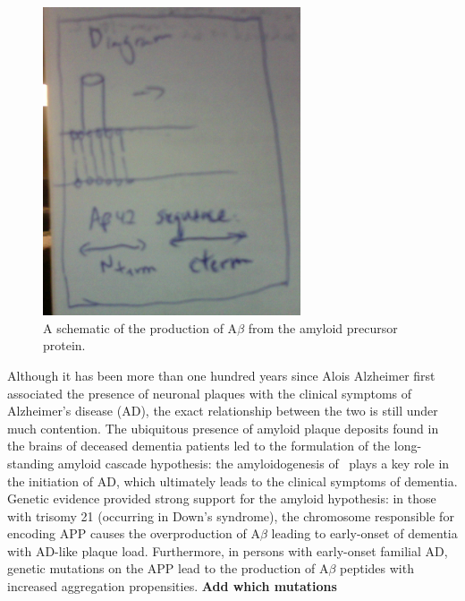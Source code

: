 \begin{figure}
\centering
\includegraphics[width=3in]{figures/introduction/AD_abeta_app.png}
\caption[APP processing]{A schematic of the production of A$\beta$ from the amyloid precursor protein.}
\label{fig:AD_abeta_app}
\end{figure}

Although it has been more than one hundred years since Alois Alzheimer first associated the presence of neuronal plaques with the clinical symptoms of Alzheimer's disease (AD), the exact relationship between the two is still under much contention.  The ubiquitous presence of amyloid plaque deposits found in the brains of deceased dementia patients led to the formulation of the long-standing amyloid cascade hypothesis: the amyloidogenesis of \abeta\ plays a key role in the initiation of AD, which ultimately leads to the clinical symptoms of dementia.\cite{Hardy:2002dh} Genetic evidence provided strong support for the amyloid hypothesis: in those with trisomy 21 (occurring in Down's syndrome), the chromosome responsible for encoding APP causes the overproduction of A$\beta$ leading to early-onset of dementia with AD-like plaque load. Furthermore, in persons with early-onset familial AD, genetic mutations on the APP lead to the production of A$\beta$ peptides with increased aggregation propensities.\cite{Tam:2012vz}
\textbf{Add which mutations}

